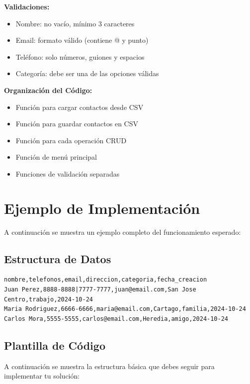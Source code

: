 \documentclass[11pt,letterpaper]{article}
\begin{document}
\textbf{Validaciones:}
\begin{itemize}
    \item Nombre: no vacío, mínimo 3 caracteres
    \item Email: formato válido (contiene @ y punto)
    \item Teléfono: solo números, guiones y espacios
    \item Categoría: debe ser una de las opciones válidas
\end{itemize}

\textbf{Organización del Código:}
\begin{itemize}
    \item Función para cargar contactos desde CSV
    \item Función para guardar contactos en CSV
    \item Función para cada operación CRUD
    \item Función de menú principal
    \item Funciones de validación separadas
\end{itemize}

\section{Ejemplo de Implementación}

A continuación se muestra un ejemplo completo del funcionamiento esperado:

\subsection{Estructura de Datos}

\begin{lstlisting}[caption={Ejemplo de archivo contactos.csv}]
nombre,telefonos,email,direccion,categoria,fecha_creacion
Juan Perez,8888-8888|7777-7777,juan@email.com,San Jose Centro,trabajo,2024-10-24
Maria Rodriguez,6666-6666,maria@email.com,Cartago,familia,2024-10-24
Carlos Mora,5555-5555,carlos@email.com,Heredia,amigo,2024-10-24
\end{lstlisting}

\subsection{Plantilla de Código}

A continuación se muestra la estructura básica que debes seguir para implementar tu solución:
\end{document}

